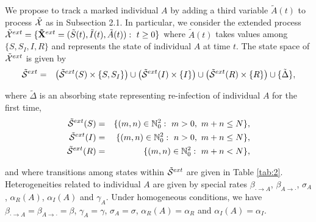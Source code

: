 \documentclass[10pt,A4paper]{article}
\begin{document}
\par We propose to track a marked individual $A$ by adding a third variable ${\tilde A}(t)$ to process ${\cal \tilde X}$ as in Subsection 2.1. In particular, we consider
the extended process ${\cal \tilde X}^{ext}=\{{\bf \tilde X}^{ext}=({\tilde S}(t),{\tilde I}(t),{\tilde A}(t)):\ t\geq0\}$ where ${\tilde A}(t)$ takes values among $\{S,S_I,I,R\}$ and represents
the state of individual $A$ at time $t$. The state space of ${\cal \tilde X}^{ext}$ is given by
\begin{eqnarray*}
 {\cal \tilde S}^{ext} &=& \left({\cal \tilde S}^{ext}(S)\times\{S,S_I\}\right)\cup\left({\cal \tilde S}^{ext}(I)\times\{I\}\right)\cup\left({\cal \tilde S}^{ext}(R)\times\{R\}\right)\cup\{\tilde \Delta\},
\end{eqnarray*}
\par\noindent where ${\tilde \Delta}$ is an absorbing state representing re-infection of individual $A$ for the first time,
\begin{eqnarray*}
{\cal \tilde S}^{ext}(S) &=& \{(m,n)\in\mathbb{N}_0^2:\ m>0,\ m+n\leq N\},\\
{\cal \tilde S}^{ext}(I) &=& \{(m,n)\in\mathbb{N}_0^2:\ n>0,\ m+n\leq N\},\\
{\cal \tilde S}^{ext}(R) &=& \{(m,n)\in\mathbb{N}_0^2:\ m+n<N\},
\end{eqnarray*}
\par\noindent and where transitions among states within ${\cal \tilde S}^{ext}$ are given in Table \ref{tab:2}. Heterogeneities related to individual $A$ are given by special rates $\beta_{\cdot\rightarrow A}$, $\beta_{A\rightarrow\cdot}$, $\sigma_A$, $\alpha_R(A)$, $\alpha_I(A)$ and $\gamma_A$. Under homogeneous conditions, we have $\beta_{\cdot\rightarrow A}=\beta_{A\rightarrow\cdot}=\beta$, $\gamma_A=\gamma$, $\sigma_A=\sigma$, $\alpha_R(A)=\alpha_R$ and $\alpha_I(A)=\alpha_I$.
\end{document}

